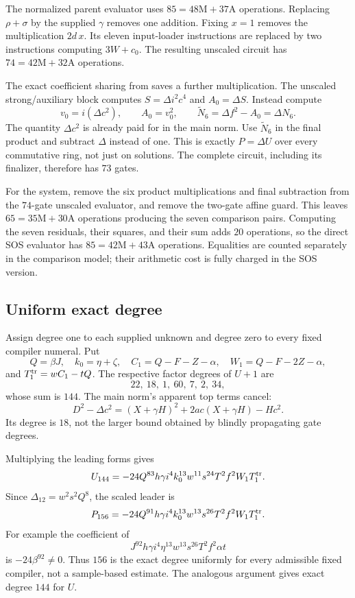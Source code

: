 \documentclass[11pt]{article}
\theoremstyle{remark}\newtheorem{remark}[theorem]{Remark}
\begin{document}
The normalized parent evaluator uses $85=48\mathrm M+37\mathrm A$
operations. Replacing $\rho+\sigma$ by the supplied $\gamma$
removes one addition. Fixing $x=1$ removes the multiplication
$2d\,x$. Its eleven input-loader instructions are replaced by
two instructions computing $3W+c_0$. The resulting unscaled
circuit has $74=42\mathrm M+32\mathrm A$ operations.

The exact coefficient sharing from \cite{Scaled84} saves a further
multiplication. The unscaled strong/auxiliary block computes
$S=\Delta i^2c^4$ and $A_0=\Delta S$. Instead compute
\[
 v_0=i(\Delta c^2),\qquad A_0=v_0^2,
 \qquad \widetilde N_6=\Delta f^2-A_0=\Delta N_6.
\]
The quantity $\Delta c^2$ is already paid for in the main norm.
Use $\widetilde N_6$ in the final product and subtract $\Delta$
instead of one. This is exactly $P=\Delta U$ over every
commutative ring, not just on solutions. The complete circuit,
including its finalizer, therefore has $73$ gates.

For the system, remove the six product multiplications and final
subtraction from the $74$-gate unscaled evaluator, and remove the
two-gate affine guard. This leaves $65=35\mathrm M+30\mathrm A$
operations producing the seven comparison pairs. Computing the
seven residuals, their squares, and their sum adds $20$ operations,
so the direct SOS evaluator has $85=42\mathrm M+43\mathrm A$
operations. Equalities are counted separately in the comparison
model; their arithmetic cost is fully charged in the SOS version.

\subsection{Uniform exact degree}

Assign degree one to each supplied unknown and degree zero to
every fixed compiler numeral. Put
\[
 Q=\beta J,\quad k_0=\eta+\zeta,\quad
 C_1=Q-F-Z-\alpha,\quad W_1=Q-F-2Z-\alpha,
\]
and $T_1^{\rm tr}=wC_1-tQ$. The respective factor degrees of
$U+1$ are
\[
 22,\ 18,\ 1,\ 60,\ 7,\ 2,\ 34,
\]
whose sum is $144$. The main norm's apparent top terms cancel:
\[
 D^2-\Delta c^2=(X+\gamma H)^2+2ac(X+\gamma H)-Hc^2.
\]
Its degree is $18$, not the larger bound obtained by blindly
propagating gate degrees.

Multiplying the leading forms gives
\begin{equation}\label{eq:Uleader}
 U_{144}=-24Q^{83}h\gamma i^4 k_0^{13}w^{11}s^{24}
 T^2f^2 W_1 T_1^{\rm tr}.
\end{equation}
Since $\Delta_{12}=w^2s^2Q^8$, the scaled leader is
\begin{equation}\label{eq:Pleader}
 P_{156}=-24Q^{91}h\gamma i^4 k_0^{13}w^{13}s^{26}
 T^2f^2 W_1 T_1^{\rm tr}.
\end{equation}
For example the coefficient of
\[
 J^{92}h\gamma i^4\eta^{13}w^{13}s^{26}T^2f^2\alpha t
\]
is $-24\beta^{92}\ne0$. Thus $156$ is the exact degree
uniformly for every admissible fixed compiler, not a sample-based
estimate. The analogous argument gives exact degree $144$ for $U$.
\end{document}
